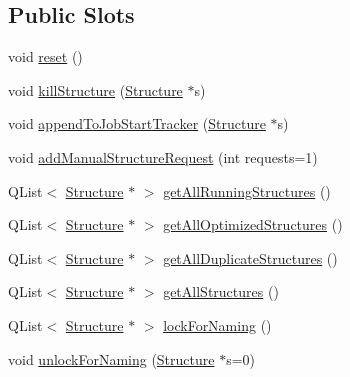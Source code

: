 \subsection*{Public Slots}
\begin{DoxyCompactItemize}
\item 
void \hyperlink{classGlobalSearch_1_1QueueManager_a36c7fd5b33bd74babfd68ee746e5017c}{reset} ()
\item 
void \hyperlink{classGlobalSearch_1_1QueueManager_aa79f26f791ec8315f2ae36d820bfa0ac}{kill\-Structure} (\hyperlink{classGlobalSearch_1_1Structure}{Structure} $\ast$s)
\item 
void \hyperlink{classGlobalSearch_1_1QueueManager_aa010ca43a5ec0c5ce653c4ab5bfebb27}{append\-To\-Job\-Start\-Tracker} (\hyperlink{classGlobalSearch_1_1Structure}{Structure} $\ast$s)
\item 
void \hyperlink{classGlobalSearch_1_1QueueManager_ab04255999ca9a52f471b37141e9e3f6e}{add\-Manual\-Structure\-Request} (int requests=1)
\item 
Q\-List$<$ \hyperlink{classGlobalSearch_1_1Structure}{Structure} $\ast$ $>$ \hyperlink{classGlobalSearch_1_1QueueManager_abb5985273cbb0126bf065acb76c2be51}{get\-All\-Running\-Structures} ()
\item 
Q\-List$<$ \hyperlink{classGlobalSearch_1_1Structure}{Structure} $\ast$ $>$ \hyperlink{classGlobalSearch_1_1QueueManager_a05ab94e45df60fb8c9078fbf81a2d80c}{get\-All\-Optimized\-Structures} ()
\item 
Q\-List$<$ \hyperlink{classGlobalSearch_1_1Structure}{Structure} $\ast$ $>$ \hyperlink{classGlobalSearch_1_1QueueManager_a14ab987c7a7939e27ba84010e9943bdd}{get\-All\-Duplicate\-Structures} ()
\item 
Q\-List$<$ \hyperlink{classGlobalSearch_1_1Structure}{Structure} $\ast$ $>$ \hyperlink{classGlobalSearch_1_1QueueManager_ad77db239019da90a79040b680f2398dc}{get\-All\-Structures} ()
\item 
Q\-List$<$ \hyperlink{classGlobalSearch_1_1Structure}{Structure} $\ast$ $>$ \hyperlink{classGlobalSearch_1_1QueueManager_a11aa65d1cc9c13424a8eac1c08fe9c0b}{lock\-For\-Naming} ()
\item 
void \hyperlink{classGlobalSearch_1_1QueueManager_a5f8012e4b5d002c444bfc486084feec1}{unlock\-For\-Naming} (\hyperlink{classGlobalSearch_1_1Structure}{Structure} $\ast$s=0)
\end{DoxyCompactItemize}
